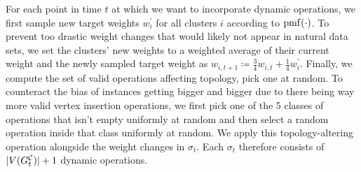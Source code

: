 For each point in time $t$ at which we want to incorporate dynamic operations, we first sample new target weights $w_i^\prime$ for all clusters $i$ according to $\operatorname{pmf}(\cdot)$.
To prevent too drastic weight changes that would likely not appear in natural data sets, we set the clusters' new weights to a weighted average of their current weight and the newly sampled target weight as $w_{i,t+1} \coloneqq \frac34 w_{i,t} + \frac14 w_i^\prime$.
Finally, we compute the set of valid operations affecting topology, pick one at random.
To counteract the bias of instances getting bigger and bigger due to there being way more valid vertex insertion operations, we first pick one of the 5 classes of operations that isn't empty uniformly at random and then select a random operation inside that class uniformly at random.
We apply this topology-altering operation alongside the weight changes in $\sigma_t$.
Each $\sigma_t$ therefore consists of $\lvert V(G^\mathcal{C}_{t}) \rvert + 1$ dynamic operations.

